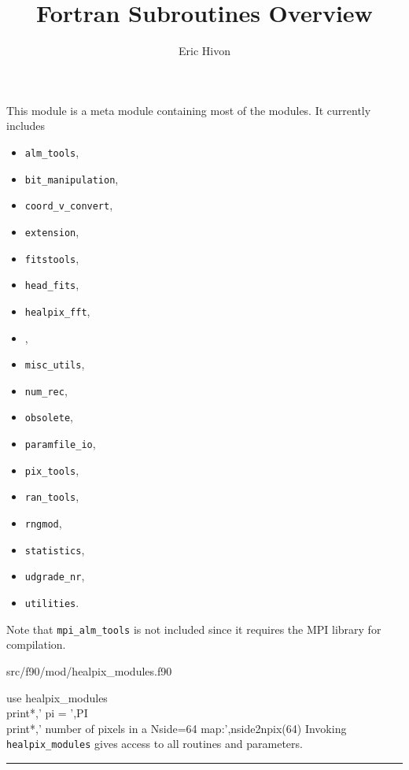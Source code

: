 
\sloppy


\title{\healpix Fortran Subroutines Overview}
 \section[healpix\_modules module]{ }
\label{sub:healpix_modules}
\author{Eric Hivon}

\begin{facility}
{This module is a meta module containing most of the \healpix modules. It currently includes
\begin{itemize}
\setlength{\itemsep}{-5pt}
  \item {\tt{alm\_tools}},
  \item {\tt{bit\_manipulation}},
  \item {\tt{coord\_v\_convert}},
  \item {\tt{extension}},
  \item {\tt{fitstools}},
  \item {\tt{head\_fits}},
  \item {\tt{healpix\_fft}},
  \item {},
  \item {\tt{misc\_utils}},
  \item {\tt{num\_rec}},
  \item {\tt{obsolete}},
  \item {\tt{paramfile\_io}},
  \item {\tt{pix\_tools}},
  \item {\tt{ran\_tools}},
  \item {\tt{rngmod}},
  \item {\tt{statistics}},
  \item {\tt{udgrade\_nr}},
  \item {\tt{utilities}}.
\end{itemize}

Note that {\tt{mpi\_alm\_tools}} is not included since it requires the MPI library for compilation.
}
{src/f90/mod/healpix\_modules.f90}
\end{facility}


\begin{example}
{
use healpix\_modules \\
print*,' pi = ',PI \\
print*,' number of pixels in a Nside=64 map:',nside2npix(64)
}
{
Invoking {\tt{healpix\_modules}} gives access to all \healpix routines and parameters.
}
\end{example}


\rule{\hsize}{2mm}

\newpage

